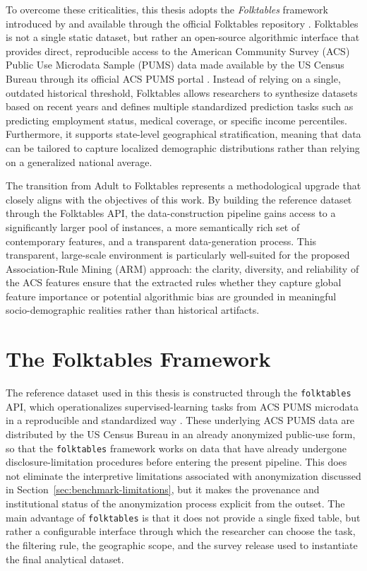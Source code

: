 To overcome these criticalities, this thesis adopts the \emph{Folktables} framework introduced by \textcite{ding2021retiring} and available through the official Folktables repository \cite{folktablesrepo}. Folktables is not a single static dataset, but rather an open-source algorithmic interface that provides direct, reproducible access to the American Community Survey (ACS) Public Use Microdata Sample (PUMS) data made available by the US Census Bureau through its official ACS PUMS portal \cite{acspumsportal}. Instead of relying on a single, outdated historical threshold, Folktables allows researchers to synthesize datasets based on recent years and defines multiple standardized prediction tasks such as predicting employment status, medical coverage, or specific income percentiles. Furthermore, it supports state-level geographical stratification, meaning that data can be tailored to capture localized demographic distributions rather than relying on a generalized national average.

The transition from Adult to Folktables represents a methodological upgrade that closely aligns with the objectives of this work. By building the reference dataset through the Folktables API, the data-construction pipeline gains access to a significantly larger pool of instances, a more semantically rich set of contemporary features, and a transparent data-generation process. This transparent, large-scale environment is particularly well-suited for the proposed Association-Rule Mining (ARM) approach: the clarity, diversity, and reliability of the ACS features ensure that the extracted rules whether they capture global feature importance or potential algorithmic bias are grounded in meaningful socio-demographic realities rather than historical artifacts.

\section{The Folktables Framework}
\label{sec:folktables-framework}
The reference dataset used in this thesis is constructed through the \texttt{folktables} API, which operationalizes supervised-learning tasks from ACS PUMS microdata in a reproducible and standardized way \cite{ding2021retiring,folktablesrepo,acspumsportal}. These underlying ACS PUMS data are distributed by the US Census Bureau in an already anonymized public-use form, so that the \texttt{folktables} framework works on data that have already undergone disclosure-limitation procedures before entering the present pipeline. This does not eliminate the interpretive limitations associated with anonymization discussed in Section~\ref{sec:benchmark-limitations}, but it makes the provenance and institutional status of the anonymization process explicit from the outset. The main advantage of \texttt{folktables} is that it does not provide a single fixed table, but rather a configurable interface through which the researcher can choose the task, the filtering rule, the geographic scope, and the survey release used to instantiate the final analytical dataset.

